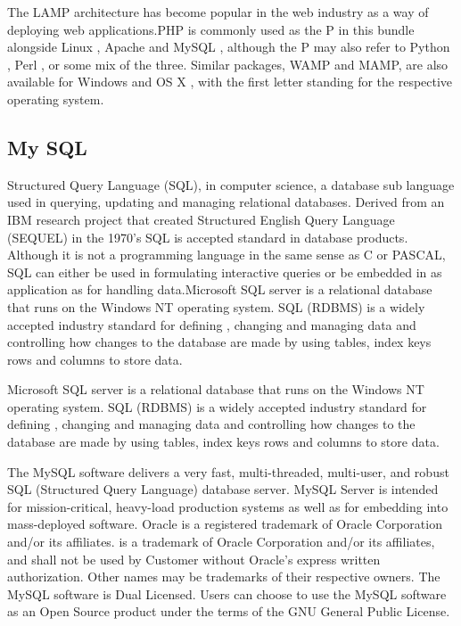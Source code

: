\documentclass[a4paper,12pt]{article}
\begin{document}
The LAMP architecture has become popular in the web industry as a way of deploying web applications.PHP is commonly used as the P in this bundle alongside Linux , Apache and MySQL , although the P may also refer to Python , Perl , or some mix of the three. Similar packages, WAMP and MAMP, are also available for Windows and OS X , with the first letter standing for the respective operating system. 
\par\vspace{2mm}
   \subsection{My SQL}\vspace{5mm}
Structured Query Language (SQL), in computer science, a database sub language used in querying, updating and managing relational databases. Derived from an IBM research project that created Structured English Query Language (SEQUEL) in the 1970’s SQL is accepted standard in database products. Although it is not a programming language in the same sense as C or PASCAL, SQL can either be used in formulating interactive queries or be embedded in as application as for handling data.Microsoft SQL server is a relational database that runs on the Windows NT operating system. SQL (RDBMS) is a widely accepted industry standard for defining , changing and managing data and controlling how changes to the database are made by using tables, index keys rows and columns to store data.\par\vspace{2mm}
Microsoft SQL server is a relational database that runs on the Windows NT operating system. SQL (RDBMS) is a widely accepted industry standard for defining , changing and managing data and controlling how changes to the database are made by using tables, index keys rows and columns to store data. 
\par\vspace{2mm}
The MySQL software delivers a very fast, multi-threaded, multi-user, and robust SQL (Structured Query Language) database server. MySQL Server is intended for mission-critical, heavy-load production systems as well as for embedding into mass-deployed software. Oracle is a registered trademark of Oracle Corporation and/or its affiliates. is a trademark of Oracle Corporation and/or its affiliates, and shall not be used by Customer without Oracle's express written authorization. Other names may be trademarks of their respective owners. 
The MySQL software is Dual Licensed. Users can choose to use the MySQL software as an Open Source product under the terms of the GNU General Public License. 
\end{document}
